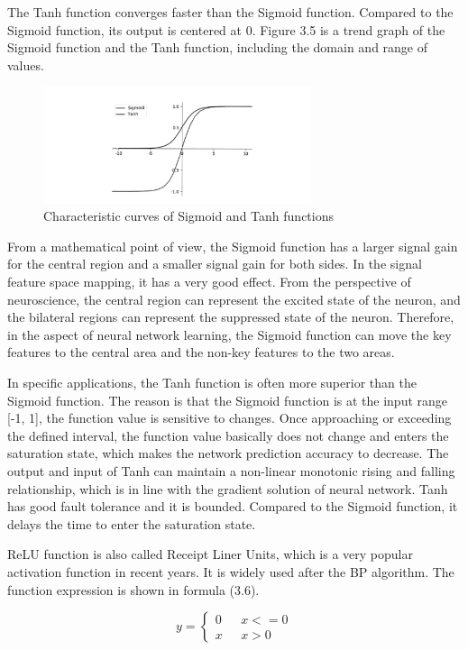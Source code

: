 The Tanh function converges faster than the Sigmoid function. Compared to the Sigmoid function, its output is centered at 0. Figure 3.5 is a trend graph of the Sigmoid function and the Tanh function, including the domain and range of values.

\begin{figure}[h]
	\centering
	\includegraphics[width=0.7\textwidth]{sigmoid.png}
	\caption{Characteristic curves of Sigmoid and Tanh functions}
\end{figure}

From a mathematical point of view, the Sigmoid function has a larger signal gain for the central region and a smaller signal gain for both sides. In the signal feature space mapping, it has a very good effect. From the perspective of neuroscience, the central region can represent the excited state of the neuron, and the bilateral regions can represent the suppressed state of the neuron. Therefore, in the aspect of neural network learning, the Sigmoid function can move the key features to the central area and the non-key features to the two areas.

In specific applications, the Tanh function is often more superior than the Sigmoid function. The reason is that the Sigmoid function is at the input range [-1, 1], the function value is sensitive to changes. Once approaching or exceeding the defined interval, the function value basically does not change and enters the saturation state, which makes the network prediction accuracy to decrease. The output and input of Tanh can maintain a non-linear monotonic rising and falling relationship, which is in line with the gradient solution of neural network. Tanh has good fault tolerance and it is bounded. Compared to the Sigmoid function, it delays the time to enter the saturation state.

ReLU function is also called Receipt Liner Units, which is a very popular activation function in recent years. It is widely used after the BP algorithm. The function expression is shown in formula (3.6).

\begin{equation}
	y=\begin{cases}
0 & \text{ } x<=0 \\ 
x & \text{  } x>0
\end{cases}
\end{equation}	


